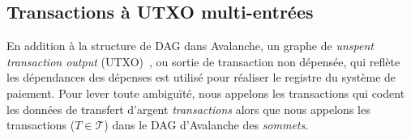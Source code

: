\documentclass[a4,twocolumn,10pt]{article}
\theoremstyle{definition}
\begin{document}
\subsection{Transactions à UTXO multi-entrées}
En addition à la structure de DAG dans Avalanche, un graphe de \emph{unspent transaction output} (UTXO)~\cite{nakamoto2008bitcoin}, ou sortie de transaction non dépensée, qui reflète les dépendances des dépenses est utilisé pour réaliser le registre du système de paiement. Pour lever toute ambiguïté, nous appelons les transactions qui codent les données de transfert d'argent \emph{transactions} alors que nous appelons les transactions ($T \in \mathcal{T}$) dans le DAG d'Avalanche des \emph{sommets}.
\end{document}

